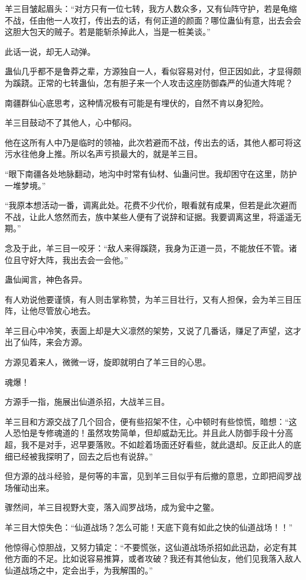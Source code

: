 \begin{this_body}
羊三目皱起眉头：“对方只有一位七转，我方人数众多，又有仙阵守护，若是龟缩不战，任由他一人攻打，传出去的话，有何正道的颜面？哪位蛊仙有意，出去会会这胆大包天的贼子。若是能斩杀掉此人，当是一桩美谈。”

此话一说，却无人动弹。

蛊仙几乎都不是鲁莽之辈，方源独自一人，看似容易对付，但正因如此，才显得颇为蹊跷。正常的七转蛊仙，怎有胆子来一个人攻击这座防御森严的仙道大阵呢？

南疆群仙心底思考，这种情况极有可能是有埋伏的，自然不肯以身犯险。

羊三目鼓动不了其他人，心中郁闷。

他在这所有人中乃是临时的领袖，此次若避而不战，传出去的话，其他人都可将这污水往他身上推。所以名声亏损最大的，就是羊三目。

“眼下南疆各处地脉翻动，地沟中时常有仙材、仙蛊问世。我却困守在这里，防护一堆梦境。”

“我原本想活动一番，调离此处。花费不少代价，眼看就有成果，但若是此次避而不战，让此人悠然而去，族中某些人便有了说辞和证据。我要调离这里，将遥遥无期。”

念及于此，羊三目一咬牙：“敌人来得蹊跷，我身为正道一员，不能放任不管。诸位且守好大阵，我出去会一会他。”

蛊仙闻言，神色各异。

有人劝说他要谨慎，有人则击掌称赞，为羊三目壮行，又有人担保，会为羊三目压阵，让他尽管放心地去。

羊三目心中冷笑，表面上却是大义凛然的架势，又说了几番话，赚足了声望，这才出了仙阵，来会方源。

方源见着来人，微微一讶，旋即就明白了羊三目的心思。

魂爆！

方源手一指，施展出仙道杀招，大战羊三目。

羊三目和方源交战了几个回合，便有些招架不住，心中顿时有些惊慌，暗想：“这人恐怕是专修魂道的！虽然攻势简单，但却威勐无比。并且此人防御手段十分高超，我不是对手，迟早要落败。不如趁着场面还好看些，就此退却。反正此人的底细已经被我探明了，回去之后也有说辞。”

但方源的战斗经验，是何等的丰富，见到羊三目似乎有后撤的意思，立即把阎罗战场催动出来。

骤然间，羊三目视野大变，落入阎罗战场，成为瓮中之鳖。

羊三目大惊失色：“仙道战场？怎么可能！天底下竟有如此之快的仙道战场！！”

他惊得心惊胆战，又努力镇定：“不要慌张，这仙道战场杀招如此迅勐，必定有其他方面的不足。比如说容易推算，或者攻破？我还有其他仙友，他们见我落入敌人仙道战场之中，定会出手，为我解围的。”


\end{this_body}
